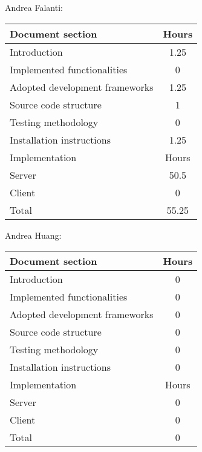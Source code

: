 Andrea Falanti:

\begin{tabular}{|l|c|}
    \hline
    Document section & Hours\\
    \hline
     Introduction & 1.25\\
     Implemented functionalities & 0\\
     Adopted development frameworks & 1.25\\
     Source code structure & 1\\
     Testing methodology & 0\\
     Installation instructions & 1.25\\
     \hline
     Implementation & Hours \\
     \hline
     Server & 50.5\\
     Client & 0\\
     \hline
     Total & 55.25\\
     \hline
\end{tabular}

\vskip 0.3in

Andrea Huang:

\begin{tabular}{|l|c|}
    \hline
    Document section & Hours \\
    \hline
     Introduction & 0\\
     Implemented functionalities & 0\\
     Adopted development frameworks & 0\\
     Source code structure & 0\\
     Testing methodology & 0\\
     Installation instructions & 0\\
     \hline
     Implementation & Hours \\
     \hline
     Server & 0\\
     Client & 0\\
     \hline
     Total & 0\\
     \hline
\end{tabular}